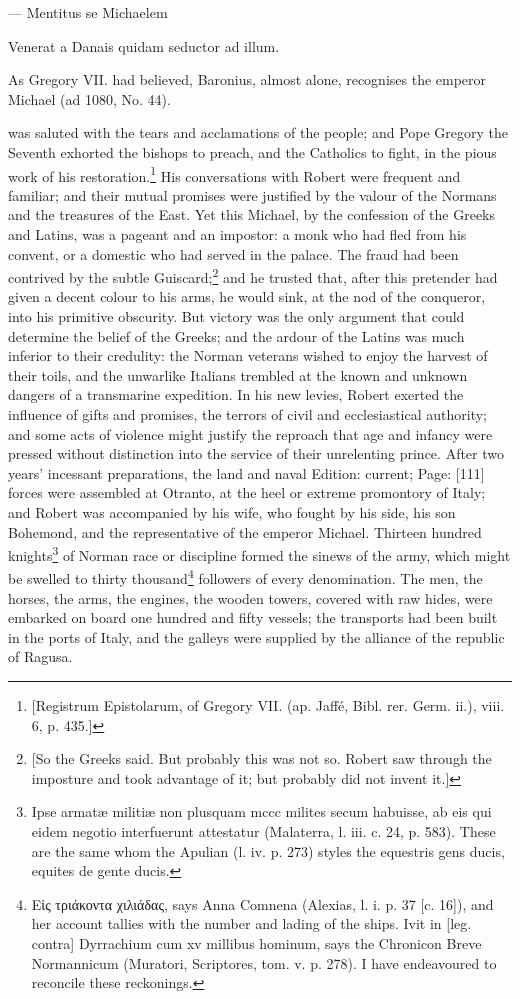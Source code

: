 {\texthebrew{—} Mentitus se Michaelem

Venerat a Danais quidam seductor ad illum.

As Gregory VII. had believed, Baronius, almost alone, recognises the emperor Michael (ad 1080, No. 44).} was saluted with the tears and acclamations of the people; and Pope Gregory the Seventh exhorted the bishops to preach, and the Catholics to fight, in the pious work of his restoration.\footnote{[Registrum Epistolarum, of Gregory VII. (ap. Jaffé, Bibl. rer. Germ. ii.), viii. 6, p. 435.]} His conversations with Robert were frequent and familiar; and their mutual promises were justified by the valour of the Normans and the treasures of the East. Yet this Michael, by the confession of the Greeks and Latins, was a pageant and an impostor: a monk who had fled from his convent, or a domestic who had served in the palace. The fraud had been contrived by the subtle Guiscard;\footnote{[So the Greeks said. But probably this was not so. Robert saw through the imposture and took advantage of it; but probably did not invent it.]} and he trusted that, after this pretender had given a decent colour to his arms, he would sink, at the nod of the conqueror, into his primitive obscurity. But victory was the only argument that could determine the belief of the Greeks; and the ardour of the Latins was much inferior to their credulity: the Norman veterans wished to enjoy the harvest of their toils, and the unwarlike Italians trembled at the known and unknown dangers of a transmarine expedition. In his new levies, Robert exerted the influence of gifts and promises, the terrors of civil and ecclesiastical authority; and some acts of violence might justify the reproach that age and infancy were pressed without distinction into the service of their unrelenting prince. After two years\texthebrew{}’ incessant preparations, the land and naval Edition: current; Page: [111] forces were assembled at Otranto, at the heel or extreme promontory of Italy; and Robert was accompanied by his wife, who fought by his side, his son Bohemond, and the representative of the emperor Michael. Thirteen hundred knights\footnote{Ipse armatæ militiæ non plusquam mccc milites secum habuisse, ab eis qui eidem negotio interfuerunt attestatur (Malaterra, l. iii. c. 24, p. 583). These are the same whom the Apulian (l. iv. p. 273) styles the equestris gens ducis, equites de gente ducis.} of Norman race or discipline formed the sinews of the army, which might be swelled to thirty thousand\footnote{\textgreek{Ε\texthebrew{ἰ}ς τριάκοντα χιλιάδας}, says Anna Comnena (Alexias, l. i. p. 37 [c. 16]), and her account tallies with the number and lading of the ships. Ivit in [leg. contra] Dyrrachium cum xv millibus hominum, says the Chronicon Breve Normannicum (Muratori, Scriptores, tom. v. p. 278). I have endeavoured to reconcile these reckonings.} followers of every denomination. The men, the horses, the arms, the engines, the wooden towers, covered with raw hides, were embarked on board one hundred and fifty vessels; the transports had been built in the ports of Italy, and the galleys were supplied by the alliance of the republic of Ragusa.

